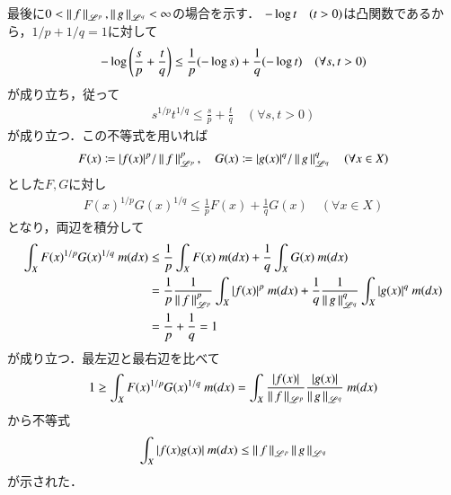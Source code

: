 \begin{prf}
\begin{description}
			最後に$0 < \left\|\, f\, \right\|_{\mathscr{L}^p},\left\|\, g\, \right\|_{\mathscr{L}^q} < \infty$の場合を示す．
			$-\operatorname{log} t \quad (t > 0)$は凸関数であるから，$1/p + 1/q = 1$に対して
			\begin{align}
				-\operatorname{log} \left( \frac{s}{p} + \frac{t}{q} \right) \leq \frac{1}{p}(-\operatorname{log} s) + \frac{1}{q}(-\operatorname{log} t) \quad (\forall s,t > 0)
			\end{align}
			が成り立ち，従って
			\begin{align}
				s^{1/p}t^{1/q} \leq \frac{s}{p} + \frac{t}{q} \quad (\forall s,t > 0)
			\end{align}
			が成り立つ．この不等式を用いれば
			\begin{align}
				F(x) \coloneqq |f(x)|^p/ \left\|\, f\, \right\|_{\mathscr{L}^p}^p,\quad G(x) \coloneqq |g(x)|^q/ \left\|\, g\, \right\|_{\mathscr{L}^q}^q \quad (\forall x \in X)
			\end{align}
			とした$F,G$に対し
			\begin{align}
				F(x)^{1/p}G(x)^{1/q} \leq \frac{1}{p}F(x) + \frac{1}{q}G(x) \quad (\forall x \in X)
			\end{align}
			となり，両辺を積分して
			\begin{align}
				\int_{X} F(x)^{1/p}G(x)^{1/q}\ m(dx) &\leq \frac{1}{p} \int_{X} F(x)\ m(dx) + \frac{1}{q} \int_{X} G(x)\ m(dx) \\
				&= \frac{1}{p} \frac{1}{\left\|\, f\, \right\|_{\mathscr{L}^p}^p} \int_{X} |f(x)|^p\ m(dx) + \frac{1}{q} \frac{1}{\left\|\, g\, \right\|_{\mathscr{L}^q}^q} \int_{X} |g(x)|^q\ m(dx) \\
				&= \frac{1}{p} + \frac{1}{q} = 1
			\end{align}
			が成り立つ．最左辺と最右辺を比べて
			\begin{align}
				1 \geq \int_{X} F(x)^{1/p}G(x)^{1/q}\ m(dx) = \int_{X} \frac{|f(x)|}{\left\|\, f\, \right\|_{\mathscr{L}^p}} \frac{|g(x)|}{\left\|\, g\, \right\|_{\mathscr{L}^q}}\ m(dx)
			\end{align}
			から不等式
			\begin{align}
				\int_{X} |f(x)g(x)|\ m(dx) \leq \left\|\, f\, \right\|_{\mathscr{L}^p}\left\|\, g\, \right\|_{\mathscr{L}^q}
			\end{align}
			が示された．
			\QED
	\end{description}
\end{prf}


